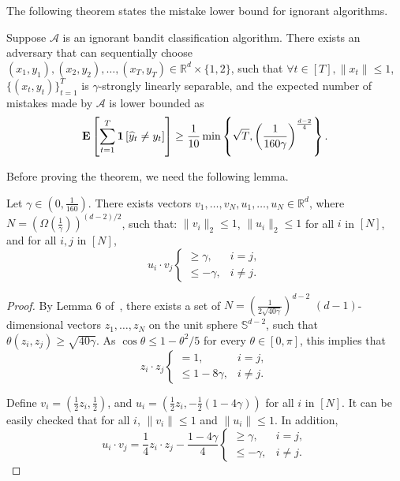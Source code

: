 The following theorem states the mistake lower bound for ignorant algorithms. 
\begin{theorem}
\label{theorem:ignorant_lower_bound}
    Suppose $\mathcal{A}$ is an ignorant bandit classification algorithm. 
    There exists an adversary that can sequentially choose $(x_1, y_1), (x_2, y_2), \ldots, (x_T, y_T) \in \mathbb{R}^d\times \{1,2\}$, 
    such that $\forall t\in[T], \|x_t\|\leq 1$, $\{(x_t, y_t)\}_{t=1}^T$ is $\gamma$-strongly linearly separable, 
    and the expected number of mistakes made by $\mathcal{A}$ is lower bounded as 
    \begin{align*}
        \operatorname*{\mathbf{E}}\left[ \sum_{t=1}^T \mathbf{1}\left[\widehat y_t \neq y_t \right] \right] \geq \frac{1}{10}\min\left\{\sqrt{T}, 
        \left(\frac{1}{160\gamma}\right)^{\frac{d-2}{4}} \right\}. 
    \end{align*}
\end{theorem}
Before proving the theorem, we need the following lemma. 
\begin{lemma}
\label{lem:embed_d_gamma}
Let $\gamma \in (0,\frac 1 {160})$. 
There exists vectors $v_1, \ldots, v_N, u_1, \ldots, u_N\in \mathbb{R}^d$, where $N = (\Omega(\frac{1}{\gamma}))^{(d-2)/2}$, such that:
$\| v_i \|_2 \leq 1$, $\| u_i \|_2 \leq 1$ for all $i$ in $[N]$, and for all $i, j$ in $[N]$,
\[ u_i \cdot v_j \begin{cases} \geq \gamma ,& i = j, \\ \leq -\gamma ,& i \neq j. \end{cases} \]
\end{lemma}
\begin{proof}
By Lemma 6 of~\cite{Long-1995}, there exists a set of $N = (\frac{1}{2\sqrt{40\gamma}})^{d-2}$ $(d-1)$-dimensional vectors $z_1, \ldots, z_N$ on the unit sphere $\mathbb{S}^{d-2}$, such that
$\theta(z_i, z_j) \geq \sqrt{40 \gamma}$. As $\cos\theta \leq 1-\theta^2/5$ for every $\theta \in [0,\pi]$,
this implies that
\[ z_i \cdot z_j \begin{cases} = 1 ,& i = j, \\ \leq 1- 8\gamma ,& i \neq j. \end{cases} \]

Define $v_i = (\frac12 z_i, \frac12)$, and $u_i = (\frac 12 z_i, -\frac 12(1-4\gamma))$ for all $i$ in $[N]$. It can be easily checked that for all $i$, $\|v_i\| \leq 1$ and $\|u_i\| \leq 1$. In addition,
\[ u_i \cdot v_j = \frac 1 4 z_i \cdot z_j - \frac {1-4\gamma} 4 \begin{cases} \geq \gamma ,& i = j, \\ \leq -\gamma ,& i \neq j. \end{cases}\]
\end{proof}

